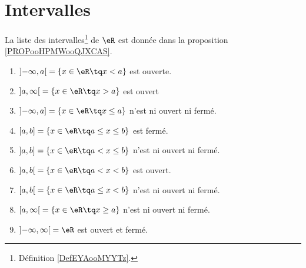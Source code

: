 
\section{Intervalles}


\begin{proposition}     \label{PROPooJJRZooACUmWN}
	La liste des intervalles\footnote{Définition \ref{DefEYAooMYYTz}.} de \( \eR\) est donnée dans la proposition \ref{PROPooHPMWooQJXCAS}.
	\begin{enumerate}
		\item		\label{ITEMooOEUKooRNNzaJ}
		      \( \mathopen]-\infty , a \mathclose[=\{ x\in \eR\tq x< a \}\)  est ouverte.
		\item \label{ITEMooGYSQooRhqHnX}
		      \( \mathopen] a , \infty \mathclose[=\{ x\in \eR\tq x>a \}\) est ouvert
		\item		\label{ITEMooCCPRooYPqFpD}
		      \( \mathopen]-\infty , a \mathclose]=\{ x\in \eR\tq x\leq a \}\) n'est ni ouvert ni fermé.
		\item		\label{ITEMooDMPGooQPbpmj}
		      \( \mathopen[ a , b \mathclose]=\{ x\in \eR\tq a\leq x\leq b \}\) est fermé.
		\item		\label{ITEMooCIZXooGNZaun}
		      \( \mathopen] a , b \mathclose]=\{ x\in \eR\tq a<x\leq b \}\) n'est ni ouvert ni fermé.
		\item	\label{ITEMooIKLSooFzrgXd}
		      \( \mathopen] a , b \mathclose[=\{ x\in \eR\tq a<x<b \}\) est ouvert.
		\item		\label{ITEMooCHNKooHxCbaQ}
		      \( \mathopen[ a , b \mathclose[=\{ x\in \eR\tq a\leq x<b \}\) n'est ni ouvert ni fermé.
		\item	\label{ITEMooZIFNooBwwoGC}
		      \( \mathopen[ a , \infty \mathclose[=\{ x\in \eR\tq x\geq a \}\) n'est ni ouvert ni fermé.
		\item		\label{ITEMooLSIPooZimrIK}
		      \( \mathopen] -\infty , \infty \mathclose[=\eR\) est ouvert et fermé.
	\end{enumerate}
\end{proposition}

